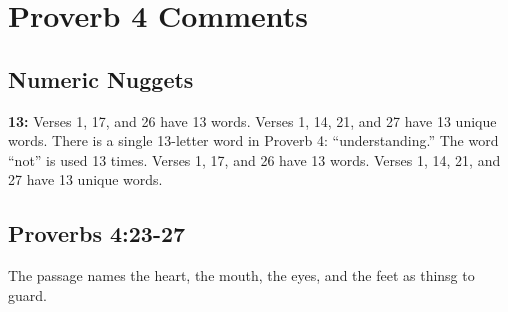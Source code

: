 \section{Proverb 4 Comments}

\subsection{Numeric Nuggets}
\textbf{13:} Verses 1, 17, and 26 have 13 words. Verses 1, 14, 21, and 27 have 13 unique words. There is a single 13-letter word in Proverb 4: ``understanding.'' The word ``not'' is used 13 times.  Verses 1, 17, and 26 have 13 words. Verses 1, 14, 21, and 27 have 13 unique words.

\subsection{Proverbs 4:23-27}
The passage names the heart, the mouth, the eyes, and the feet as thinsg to guard.

